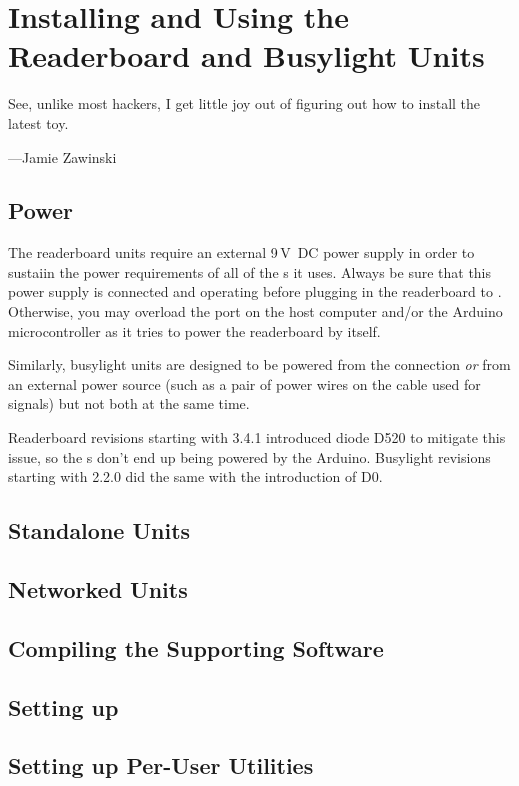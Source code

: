 \chapter{Installing and Using the Readerboard and Busylight Units}
\epigraph{See, unlike most hackers, I get little joy out of figuring out how to install the latest toy.}{---Jamie Zawinski}
\section{Power}
The readerboard units require an external 9\,V~DC power supply in order to sustaiin the power requirements of all of the
\led s it uses. Always be sure that this power supply is connected and operating before plugging in the readerboard to .
Otherwise, you may overload the  port on the host computer and/or the Arduino microcontroller as it tries to power the readerboard by itself.

Similarly, busylight units are designed to be powered from the  connection \emph{or} from an external power source (such as a
pair of power wires on the  cable used for  signals) but not both at the same time.

Readerboard  revisions starting with 3.4.1 introduced diode D520 to mitigate this issue, so the \led s don't end up being powered by the
Arduino. Busylight  revisions starting with 2.2.0 did the same with the introduction of D0.

\section{Standalone Units}
\section{Networked Units}
\section{Compiling the Supporting Software}
\section{Setting up }
\section{Setting up Per-User Utilities}
\subsection{}
